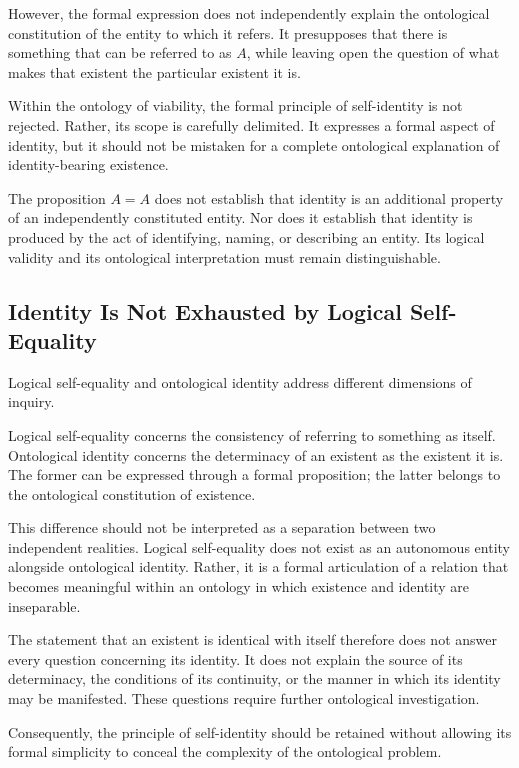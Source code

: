 However, the formal expression does not independently explain the ontological constitution of the entity to which it refers. It presupposes that there is something that can be referred to as \(A\), while leaving open the question of what makes that existent the particular existent it is.

Within the ontology of viability, the formal principle of self-identity is not rejected. Rather, its scope is carefully delimited. It expresses a formal aspect of identity, but it should not be mistaken for a complete ontological explanation of identity-bearing existence.

The proposition \(A = A\) does not establish that identity is an additional property of an independently constituted entity. Nor does it establish that identity is produced by the act of identifying, naming, or describing an entity. Its logical validity and its ontological interpretation must remain distinguishable.

\subsection{Identity Is Not Exhausted by Logical Self-Equality}

Logical self-equality and ontological identity address different dimensions of inquiry.

Logical self-equality concerns the consistency of referring to something as itself. Ontological identity concerns the determinacy of an existent as the existent it is. The former can be expressed through a formal proposition; the latter belongs to the ontological constitution of existence.

This difference should not be interpreted as a separation between two independent realities. Logical self-equality does not exist as an autonomous entity alongside ontological identity. Rather, it is a formal articulation of a relation that becomes meaningful within an ontology in which existence and identity are inseparable.

The statement that an existent is identical with itself therefore does not answer every question concerning its identity. It does not explain the source of its determinacy, the conditions of its continuity, or the manner in which its identity may be manifested. These questions require further ontological investigation.

Consequently, the principle of self-identity should be retained without allowing its formal simplicity to conceal the complexity of the ontological problem.

